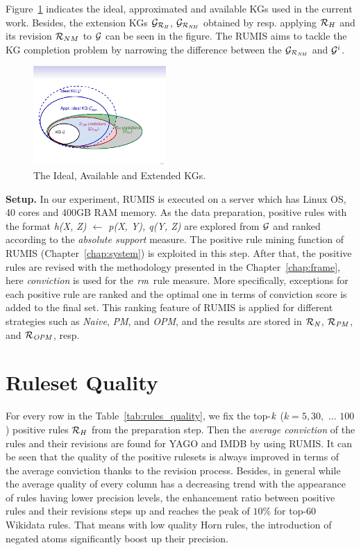 Figure~\ref{fig:venn} indicates the ideal, approximated and available KGs used in the current work. Besides, the extension KGs $\mathcal{G}_{\mathcal{R}_{\mathit{H}}}$, $\mathcal{G}_{\mathcal{R}_{\mathit{NM}}}$ obtained by resp. applying $\mathcal{R}_H$ and its revision $\mathcal{R}_{NM}$ to $\mathcal{G}$ can be seen in the figure. The RUMIS aims to tackle the KG completion problem by narrowing the difference between the $\mathcal{G}_{\mathcal{R}_{\mathit{NM}}}$ and $ \mathcal{G}^i$.

\begin{figure}[ht]
\centering
\includegraphics[width=0.45\textwidth]{figures/big_pic_exp}
\caption{The Ideal, Available and Extended KGs.}
\label{fig:venn}
\end{figure}

\textbf{Setup.} In our experiment, RUMIS is executed on a server which has Linux OS, 40 cores and 400GB RAM memory. As the data preparation, positive rules with the format \textit{h(X, Z) $\leftarrow$ p(X, Y), q(Y, Z)} are explored from $\mathcal{G}$ and ranked according to the \textit{absolute support} measure. The positive rule mining function of RUMIS (Chapter~\ref{chap:system}) is exploited in this step. After that, the positive rules are revised with the methodology presented in the Chapter~\ref{chap:frame}, here \textit{conviction} is used for the $\mathit{rm}$ rule measure. More specifically, exceptions for each positive rule are ranked and the optimal one in terms of conviction score is added to the final set. This ranking feature of RUMIS is applied for different strategies such as \emph{Naive}, \emph{PM}, and \emph{OPM}, and the results are stored in $\mathit{\mathcal{R}_{N}}$, $\mathit{\mathcal{R}_{PM}}$, and $\mathit{\mathcal{R}_{OPM}}$, resp.

\section{Ruleset Quality}

For every row in the Table~\ref{tab:rules_quality}, we fix the top-$\mathit{k}$ ($k=5,30,$ ... $100$) positive rules $\mathcal{R}_{H}$ from the preparation step. Then the \textit{average conviction} of the rules and their revisions are found for YAGO and IMDB by using RUMIS. It can be seen that the quality of the positive rulesets is always improved in terms of the average conviction thanks to the revision process. Besides, in general while the average quality of every column has a decreasing trend with the appearance of rules having lower precision levels, the enhancement ratio between positive rules and their revisions steps up and reaches the peak of $10\%$ for top-60 Wikidata rules. That means with low quality Horn rules, the introduction of negated atoms significantly boost up their precision.

